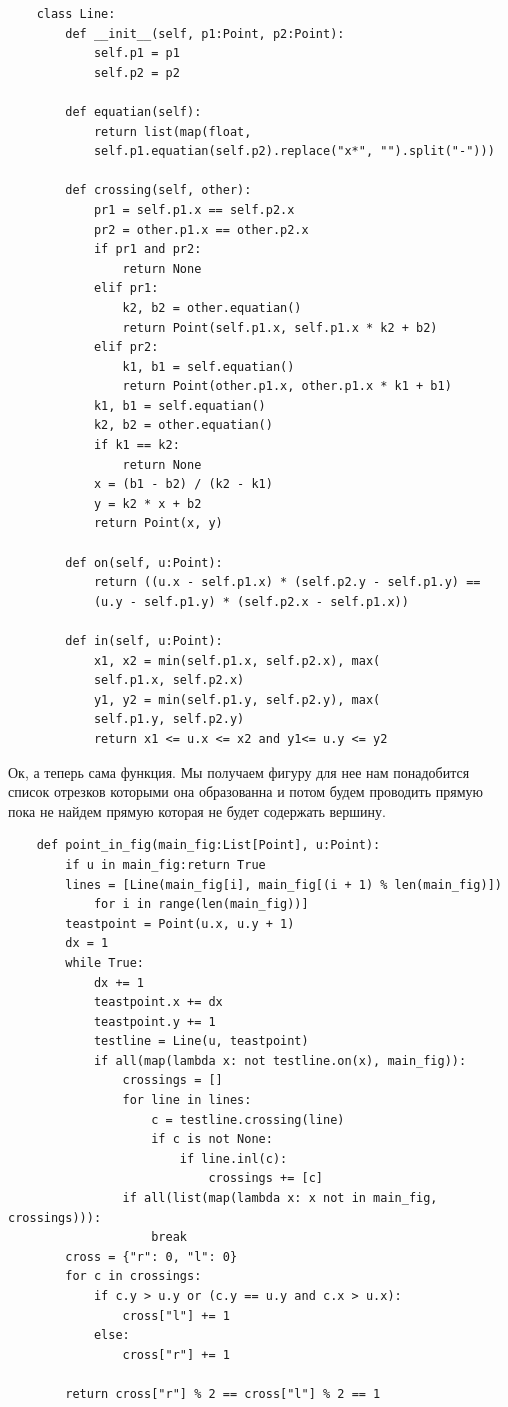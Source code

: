 \documentclass[12pt]{article} %
\begin{document}
 	\begin{verbatim}
 	class Line:
 	    def __init__(self, p1:Point, p2:Point):
 	        self.p1 = p1
 	        self.p2 = p2
 	    
 	    def equatian(self):
 	        return list(map(float, 
 	        self.p1.equatian(self.p2).replace("x*", "").split("-")))
 	    
 	    def crossing(self, other):
 	        pr1 = self.p1.x == self.p2.x
 	        pr2 = other.p1.x == other.p2.x
 	        if pr1 and pr2:
 	            return None
 	        elif pr1:
 	            k2, b2 = other.equatian()
 	            return Point(self.p1.x, self.p1.x * k2 + b2)
 	        elif pr2:
 	            k1, b1 = self.equatian()
 	            return Point(other.p1.x, other.p1.x * k1 + b1)
 	        k1, b1 = self.equatian()
 	        k2, b2 = other.equatian()
 	        if k1 == k2:
 	            return None
 	        x = (b1 - b2) / (k2 - k1)
 	        y = k2 * x + b2
 	        return Point(x, y)
 	    
 	    def on(self, u:Point):
 	        return ((u.x - self.p1.x) * (self.p2.y - self.p1.y) == 
 	        (u.y - self.p1.y) * (self.p2.x - self.p1.x))
 	    
 	    def in(self, u:Point):
 	        x1, x2 = min(self.p1.x, self.p2.x), max(
 	        self.p1.x, self.p2.x)
 	        y1, y2 = min(self.p1.y, self.p2.y), max(
 	        self.p1.y, self.p2.y)
 	        return x1 <= u.x <= x2 and y1<= u.y <= y2
 	\end{verbatim}
 	\hspace*{1cm}Ок, а теперь сама функция. Мы получаем фигуру для нее нам понадобится список отрезков которыми она образованна и потом будем проводить прямую пока не найдем прямую которая не будет содержать вершину.
 	\begin{verbatim}
 	def point_in_fig(main_fig:List[Point], u:Point):
 	    if u in main_fig:return True
 	    lines = [Line(main_fig[i], main_fig[(i + 1) % len(main_fig)])
 	        for i in range(len(main_fig))]
 	    teastpoint = Point(u.x, u.y + 1)
 	    dx = 1
 	    while True:
 	        dx += 1
         	teastpoint.x += dx
         	teastpoint.y += 1
         	testline = Line(u, teastpoint)
         	if all(map(lambda x: not testline.on(x), main_fig)):
             	crossings = []
 	            for line in lines:
 	                c = testline.crossing(line)
 	                if c is not None:
 	                    if line.inl(c):
 	                        crossings += [c]
 	            if all(list(map(lambda x: x not in main_fig, crossings))):
                 	break
 	    cross = {"r": 0, "l": 0}
     	for c in crossings:
         	if c.y > u.y or (c.y == u.y and c.x > u.x):
             	cross["l"] += 1
         	else:
             	cross["r"] += 1
     
     	return cross["r"] % 2 == cross["l"] % 2 == 1
 	\end{verbatim}
\end{document}
